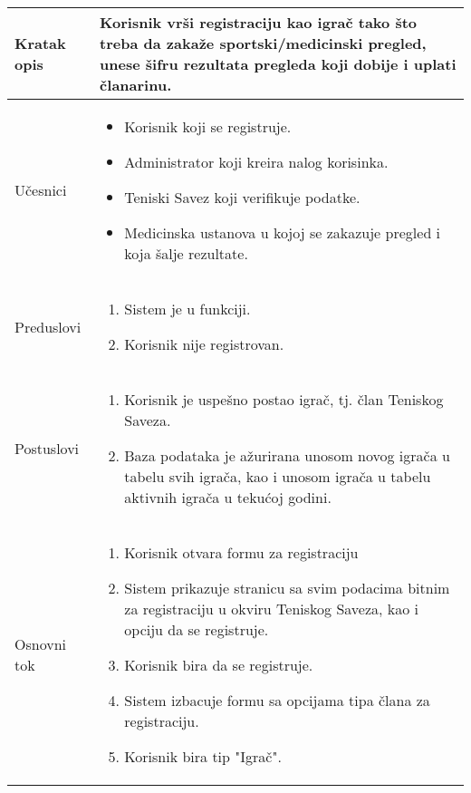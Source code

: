 \documentclass{article}
\begin{document}
        \begin{longtable}{| p{} | p{} |} 
            \hline
                Kratak opis & Korisnik vrši registraciju kao igrač tako što treba da zakaže sportski/medicinski pregled, unese šifru rezultata pregleda koji dobije i uplati članarinu.\\ 
            \hline    
                Učesnici & \begin{itemize}
                    \item Korisnik koji se registruje.
                    \item Administrator koji kreira nalog korisinka.
                    \item Teniski Savez koji verifikuje podatke.
                    \item Medicinska ustanova u kojoj se zakazuje pregled i koja šalje rezultate.
                \end{itemize} \\
            \hline
               Preduslovi & \begin{enumerate}
                   \item Sistem je u funkciji.
                   \item Korisnik nije registrovan.
               \end{enumerate}\\
            \hline  
                Postuslovi & \begin{enumerate}
                    \item Korisnik je uspešno postao igrač, tj. član Teniskog Saveza.
                    \item Baza podataka je ažurirana unosom novog igrača u tabelu svih igrača, kao i unosom igrača u tabelu aktivnih igrača u tekućoj godini.
                \end{enumerate}\\
            \hline
                Osnovni tok & \begin{enumerate}
                    \item Korisnik otvara formu za registraciju
                    \item Sistem prikazuje stranicu sa svim podacima bitnim za registraciju u okviru Teniskog Saveza, kao i opciju da se registruje.
                    \item Korisnik bira da se registruje.
                    \item Sistem izbacuje formu sa opcijama tipa člana za registraciju.
                    \item Korisnik bira tip "Igrač".

\end{enumerate}
\end{longtable}
\end{document}

